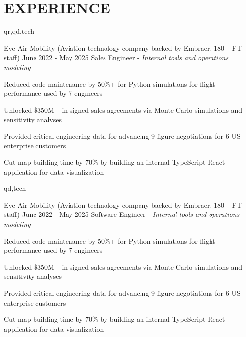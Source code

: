 \section{EXPERIENCE}

\begin{rolecontent}{qr,qd,tech}
\begin{experience}
                   {Eve Air Mobility \textnormal{(Aviation technology company backed by Embraer, 180+ FT staff)}}
                   {June 2022 - May 2025}
                   {Sales Engineer - \textnormal{\textit{Internal tools and operations modeling}}}
    \item Reduced code maintenance by 50\%+ for Python simulations for flight performance used by 7 engineers
    \item Unlocked \$350M+ in signed sales agreements via Monte Carlo simulations and sensitivity analyses
    \item Provided critical engineering data for advancing 9-figure negotiations for 6 US enterprise customers
    \item Cut map-building time by 70\% by building an internal TypeScript React application for data visualization 
\end{experience}
\end{rolecontent}

\begin{rolecontent}{qd,tech}
\begin{experience}
                   {Eve Air Mobility \textnormal{(Aviation technology company backed by Embraer, 180+ FT staff)}}
                   {June 2022 - May 2025}
                   {Software Engineer - \textnormal{\textit{Internal tools and operations modeling}}}
    \item Reduced code maintenance by 50\%+ for Python simulations for flight performance used by 7 engineers
    \item Unlocked \$350M+ in signed sales agreements via Monte Carlo simulations and sensitivity analyses
    \item Provided critical engineering data for advancing 9-figure negotiations for 6 US enterprise customers
    \item Cut map-building time by 70\% by building an internal TypeScript React application for data visualization 
\end{experience}
\end{rolecontent}


